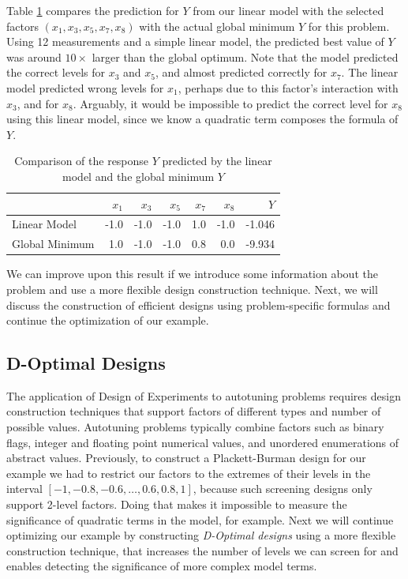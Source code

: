\documentclass[conference]{IEEEtran}
\begin{document}
Table \ref{tab:linear_prediction_comparison} compares the prediction for \(Y\)
from our linear model with the selected factors \((x_1,x_3,x_5,x_7,x_8)\) with the
actual global minimum \(Y\) for this problem. Using 12 measurements and a simple
linear model, the predicted best value of \(Y\) was around \(10\times\) larger than
the global optimum. Note that the model predicted the correct levels for \(x_3\)
and \(x_5\), and almost predicted correctly for \(x_7\). The linear model predicted
wrong levels for \(x_1\), perhaps due to this factor's interaction with \(x_3\), and
for \(x_8\). Arguably, it would be impossible to predict the correct level for
\(x_8\) using this linear model, since we know a quadratic term composes the
formula of \(Y\).

\begin{table}[ht]
\centering
\caption{Comparison of the response $Y$ predicted by the linear model and the global minimum $Y$}
\label{tab:linear_prediction_comparison}
\begingroup\footnotesize
\begin{tabular}{lrrrrrr}
  \toprule
 & $x_1$ & $x_3$ & $x_5$ & $x_7$ & $x_8$ & $Y$ \\
  \midrule
Linear Model & -1.0 & -1.0 & -1.0 & 1.0 & -1.0 & -1.046 \\
  Global Minimum & 1.0 & -1.0 & -1.0 & 0.8 & 0.0 & -9.934 \\
   \bottomrule
\end{tabular}
\endgroup
\end{table}

We can improve upon this result if we introduce some information about the
problem and use a more flexible design construction technique. Next, we will
discuss the construction of efficient designs using problem-specific formulas
and continue the optimization of our example.
\subsection{D-Optimal Designs}
\label{sec:org4e89297}
The application of Design of Experiments to autotuning problems requires design
construction techniques that support factors of different types and number of
possible values. Autotuning problems typically combine factors such as binary
flags, integer and floating point numerical values, and unordered enumerations
of abstract values. Previously, to construct a Plackett-Burman design for our
example we had to restrict our factors to the extremes of their levels in the
interval \([-1, -0.8, -0.6,\dots,0.6, 0.8, 1]\), because such screening designs
only support 2-level factors. Doing that makes it impossible to measure the
significance of quadratic terms in the model, for example. Next we will continue
optimizing our example by constructing \emph{D-Optimal designs} using a more flexible
construction technique, that increases the number of levels we can screen for
and enables detecting the significance of more complex model terms.
\end{document}
